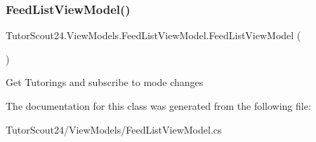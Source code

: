 \subsubsection{\texorpdfstring{Feed\+List\+View\+Model()}{FeedListViewModel()}}
{\footnotesize\ttfamily Tutor\+Scout24.\+View\+Models.\+Feed\+List\+View\+Model.\+Feed\+List\+View\+Model (\begin{DoxyParamCaption}{ }\end{DoxyParamCaption})\hspace{0.3cm}{\ttfamily [inline]}}



Get Tutorings and subscribe to mode changes 



The documentation for this class was generated from the following file\+:\begin{DoxyCompactItemize}
\item 
Tutor\+Scout24/\+View\+Models/Feed\+List\+View\+Model.\+cs\end{DoxyCompactItemize}
